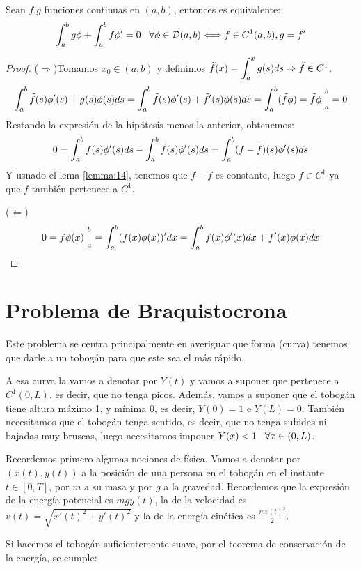 \begin{lemma}
Sean $f$,$g$ funciones continuas en $(a,b)$, entonces es equivalente:
\[
\displaystyle\int_{ a }^{ b } g\phi+\displaystyle\int_{ a }^{ b } f\phi'=0 \;\;\; \forall\phi\in\mathcal{D}(a,b) \Longleftrightarrow f\in C^1(a,b), g=f'
\]
\end{lemma}

\begin{proof}

($\Rightarrow$)Tomamos $x_0\in(a,b)$ y definimos $\tilde{f}(x)=\displaystyle\int_{ a }^{ x } g(s)ds\Rightarrow \tilde{f}\in C^1$.
\[
\displaystyle\int_{ a }^{ b } \tilde{f}(s)\phi'(s)+g(s)\phi(s)ds=\displaystyle\int_{ a }^{ b } \tilde{f}(s)\phi'(s)+\tilde{f}'(s)\phi(s)ds=\displaystyle\int_{ a }^{ b } (\tilde{f}\phi)=\tilde{f}\phi\Big|_a^b=0
\]
Restando la expresión de la hipótesis menos la anterior, obtenemos:
\[
0=\displaystyle\int_{ a }^{ b } f(s)\phi'(s)ds-\displaystyle\int_{ a }^{ b } \tilde{f}(s)\phi'(s)ds=\displaystyle\int_{ a }^{ b } (f-\tilde{f})(s)\phi'(s)ds
\]
Y usnado el lema \ref{lemma:14}, tenemos que $f-\tilde{f}$ es constante, luego $f\in C^1$ ya que $\tilde{f}$ también pertenece a $C^1$.

($\Leftarrow$) 
\[
0=f\phi(x)\Big|_a^b=\displaystyle\int_{ a }^{ b } (f(x)\phi(x))'dx=\displaystyle\int_{ a }^{ b } f(x)\phi'(x)dx+f'(x)\phi(x)dx
\]
\end{proof}

\section{Problema de Braquistocrona}

Este problema se centra principalmente en averiguar que forma (curva) tenemos que darle a un tobogán para que este sea el más rápido.

A esa curva la vamos a denotar por $Y(t)$ y vamos a suponer que  pertenece a $C^1(0,L)$, es decir, que no tenga picos. Además, vamos a suponer que el tobogán tiene altura máximo 1, y mínima 0, es decir, $Y(0)=1$ e $Y(L)=0$. También necesitamos que el tobogán tenga sentido, es decir, que no tenga subidas ni bajadas muy bruscas, luego necesitamos imponer $Y(x)<1 \;\;\; \forall x \in (0,L)$.

Recordemos primero algunas nociones de física. Vamos a denotar por $(x(t),y(t))$ a la posición de una persona en el tobogán en el instante $t\in[0,T]$, por $m$ a su masa y por $g$ a la gravedad. Recordemos que la expresión de la energía potencial es $mgy(t)$, la de la velocidad es $v(t)=\sqrt{x'(t)^2+y'(t)^2}$ y la de la energía cinética es $\frac{mv(t)^2}{2}$.

Si hacemos el tobogán suficientemente suave, por el teorema de conservación de la energía, se cumple:

